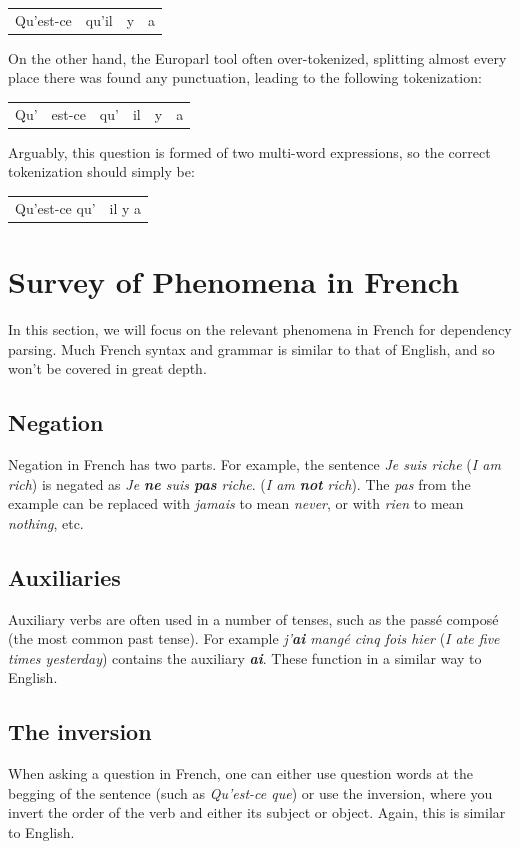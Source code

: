 \documentclass[11pt,letterpaper]{article}
\begin{document}
\begin{center}
\begin{tabular}{c|c|c|c}
Qu'est-ce & qu'il & y & a \\
\end{tabular}
\end{center}
On the other hand, the Europarl tool often over-tokenized, splitting almost every place there was found any punctuation, leading to the following tokenization:
\begin{center}
\begin{tabular}{c|c|c|c|c|c}
Qu'& est-ce & qu'& il & y & a \\
\end{tabular}
\end{center}
Arguably, this question is formed of two multi-word expressions, so the correct tokenization should simply be:
\begin{center}
\begin{tabular}{c|c}
Qu'est-ce qu'& il y a \\
\end{tabular}
\end{center}
\section{Survey of Phenomena in French}
In this section, we will focus on the relevant phenomena in French for dependency parsing. Much French syntax and grammar is similar to that of English, and so won't be covered in great depth. 
\subsection{Negation}
Negation in French has two parts. For example, the sentence \textit{Je suis riche} (\textit{I am rich}) is negated as \textit{Je \textbf{ne} suis \textbf{pas} riche}. (\textit{I am \textbf{not} rich}). The \textit{pas} from the example can be replaced with \textit{jamais} to mean \textit{never}, or with \textit{rien} to mean \textit{nothing}, etc.
\subsection{Auxiliaries}
Auxiliary verbs are often used in a number of tenses, such as the pass\'{e} compos\'{e} (the most common past tense). For example \textit{j'\textbf{ai} mangé cinq fois hier} (\textit{I ate five times yesterday}) contains the auxiliary \textit{\textbf{ai}}. These function in a similar way to English. 
\subsection{The inversion}
When asking a question in French, one can either use question words at the begging of the sentence (such as \textit{Qu'est-ce que}) or use the inversion, where you invert the order of the verb and either its subject or object. Again, this is similar to English.
\end{document}
